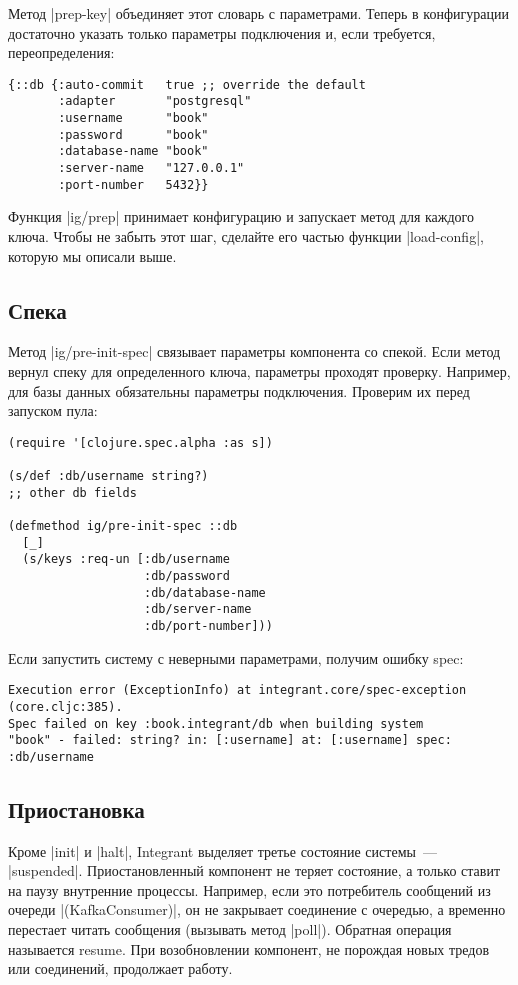 Метод \spverb|prep-key| объединяет этот словарь с параметрами. Теперь в конфигурации
достаточно указать только параметры подключения и, если требуется,
переопределения:

\begin{verbatim}
{::db {:auto-commit   true ;; override the default
       :adapter       "postgresql"
       :username      "book"
       :password      "book"
       :database-name "book"
       :server-name   "127.0.0.1"
       :port-number   5432}}
\end{verbatim}

Функция \spverb|ig/prep| принимает конфигурацию и запускает метод для каждого
ключа. Чтобы не забыть этот шаг, сделайте его частью функции \spverb|load-config|,
которую мы описали выше.

\subsection{Спека}

Метод \spverb|ig/pre-init-spec| связывает параметры компонента со спекой. Если метод
вернул спеку для определенного ключа, параметры проходят проверку. Например, для
базы данных обязательны параметры подключения. Проверим их перед запуском пула:

\begin{verbatim}
(require '[clojure.spec.alpha :as s])

(s/def :db/username string?)
;; other db fields

(defmethod ig/pre-init-spec ::db
  [_]
  (s/keys :req-un [:db/username
                   :db/password
                   :db/database-name
                   :db/server-name
                   :db/port-number]))
\end{verbatim}

Если запустить систему с неверными параметрами, получим ошибку spec:

\begin{verbatim}
Execution error (ExceptionInfo) at integrant.core/spec-exception (core.cljc:385).
Spec failed on key :book.integrant/db when building system
"book" - failed: string? in: [:username] at: [:username] spec: :db/username
\end{verbatim}

\subsection{Приостановка}

Кроме \spverb|init| и \spverb|halt|, Integrant выделяет третье состояние системы~---
\spverb|suspended|. Приостановленный компонент не теряет состояние, а только ставит на
паузу внутренние процессы. Например, если это потребитель сообщений из очереди
\spverb|(KafkaConsumer)|, он не закрывает соединение с очередью, а временно перестает
читать сообщения (вызывать метод \spverb|poll|). Обратная операция называется
resume. При возобновлении компонент, не порождая новых тредов или соединений,
продолжает работу.

